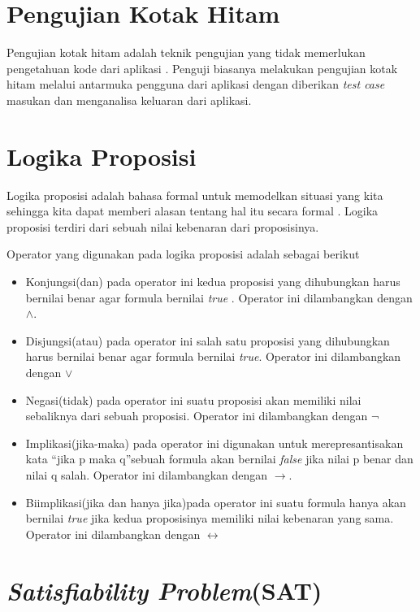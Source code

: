 \section{Pengujian Kotak Hitam}

Pengujian kotak hitam adalah teknik pengujian yang tidak memerlukan pengetahuan kode dari aplikasi \cite{TEST1}. Penguji biasanya melakukan pengujian kotak hitam melalui antarmuka pengguna dari aplikasi dengan diberikan \textit{test case} masukan dan menganalisa keluaran dari aplikasi.

\section{Logika Proposisi}

Logika proposisi adalah bahasa formal untuk memodelkan situasi yang kita sehingga kita dapat memberi alasan tentang hal itu secara formal \cite{huth2004logic}. Logika proposisi terdiri dari sebuah nilai kebenaran dari proposisinya.

Operator yang digunakan pada logika proposisi adalah sebagai berikut

\begin{itemize}
	\item Konjungsi(dan) pada operator ini kedua proposisi yang dihubungkan harus bernilai benar agar formula bernilai \textit{true}
	. Operator ini dilambangkan dengan $\wedge$.
	\item Disjungsi(atau) pada operator ini salah satu proposisi yang dihubungkan harus bernilai benar agar formula bernilai \textit{true}. Operator ini dilambangkan dengan $\lor$ 
	\item Negasi(tidak) pada operator ini suatu proposisi akan memiliki nilai sebaliknya dari sebuah proposisi. Operator ini dilambangkan dengan $\neg$
	\item Implikasi(jika-maka) pada operator ini digunakan untuk merepresantisakan kata \textquotedblleft jika p maka q\textquotedblright sebuah formula akan bernilai \textit{false} jika nilai p benar dan nilai q salah. Operator ini dilambangkan dengan $\to$. 
	\item Biimplikasi(jika dan hanya jika)pada operator ini suatu formula hanya akan bernilai \textit{true} jika kedua proposisinya memiliki nilai kebenaran yang sama. Operator ini dilambangkan dengan $\leftrightarrow$
	
\end{itemize}

\section{\textit{Satisfiability Problem}(SAT)}

